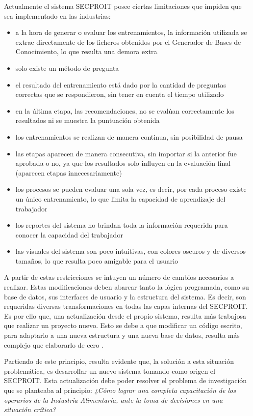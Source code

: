 Actualmente el sistema SECPROIT posee ciertas limitaciones que impiden que sea implementado en las industrias:
\begin{itemize}
\item a la hora de generar o evaluar los entrenamientos, la información utilizada se extrae directamente de los ficheros obtenidos por el Generador de Bases de Conocimiento, lo que resulta una demora extra
\item solo existe un método de pregunta
\item el resultado del entrenamiento está dado por la cantidad de preguntas correctas que se respondieron, sin tener en cuenta el tiempo utilizado
\item en la última etapa, las recomendaciones, no se evalúan correctamente los resultados ni se muestra la puntuación obtenida
\item los entrenamientos se realizan de manera continua, sin posibilidad de pausa
\item las etapas aparecen de manera consecutiva, sin importar si la anterior fue aprobada o no, ya que los resultados solo influyen en la evaluación final (aparecen etapas innecesariamente)
\item los procesos se pueden evaluar una sola vez, es decir, por cada proceso existe un único entrenamiento, lo que limita la capacidad de aprendizaje del trabajador
\item los reportes del sistema no brindan toda la información requerida para conocer la capacidad del trabajador
\item las visuales del sistema son poco intuitivas, con colores oscuros y de diversos tamaños, lo que resulta poco amigable para el usuario
\end{itemize}

A partir de estas restricciones se intuyen un número de cambios necesarios a realizar. Estas modificaciones deben abarcar tanto la lógica programada, como su base de datos, sus interfaces de usuario y la estructura del sistema. Es decir, son requeridas diversas transformaciones en todas las capas internas del SECPROIT.
Es por ello que, una actualización desde el propio sistema, resulta más trabajosa que realizar un proyecto nuevo. Esto se debe a que modificar un código escrito, para adaptarlo a una nueva estructura y una nueva base de datos, resulta más complejo que elaborarlo de cero \cite{Plecka2013}.

Partiendo de este principio, resulta evidente que, la solución a esta situación problemática, es desarrollar un nuevo sistema tomando como origen el SECPROIT.
Esta actualización debe poder resolver el problema de investigación que se planteaba al principio: 
\textsl{¿Cómo lograr una completa capacitación de los operarios de la Industria Alimentaria, ante la toma de decisiones en una situación crítica?}

